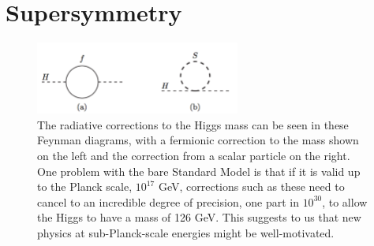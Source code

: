 


 
 
 
\section{Supersymmetry}

\begin{centering}
    \begin{figure} \center
    \includegraphics[width=0.6\textwidth]{Theory/FeynmanDiagrams/Higgs_mass_corrections.pdf}
    \caption{The radiative corrections to the Higgs mass can be seen
    in these Feynman diagrams, with a fermionic correction to the mass shown on the left and 
    the correction from a scalar particle on the right.  One problem with the bare Standard Model
    is that if it is valid up to the Planck scale, $10^{17}$ GeV,  
    corrections such as these need to cancel to an incredible
    degree of precision, one part in $10^{30}$, to allow the Higgs to have a mass of 126 GeV. 
    This suggests to us that new physics at sub-Planck-scale energies might be well-motivated.\cite{martin}
    \label{fig:higgs_mass_corrections}}
    \end{figure}
\end{centering}

